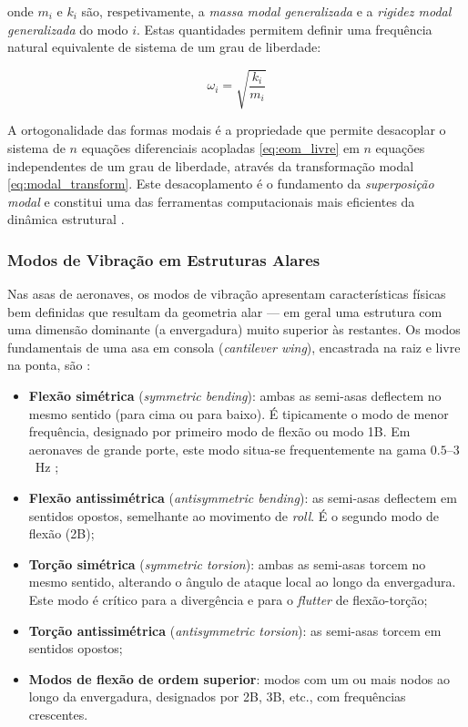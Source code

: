 \documentclass[a4paper,fleqn,noprintline]{cas-dc}
\begin{document}
\noindent onde $m_i$ e $k_i$ são, respetivamente, a \textit{massa modal generalizada} e a \textit{rigidez modal generalizada} do modo $i$. Estas quantidades permitem definir uma frequência natural equivalente de sistema de um grau de liberdade:

\begin{equation}
    \omega_i = \sqrt{\frac{k_i}{m_i}}
    \label{eq:omega_sdof}
\end{equation}

A ortogonalidade das formas modais é a propriedade que permite desacoplar o sistema de $n$ equações diferenciais acopladas \eqref{eq:eom_livre} em $n$ equações independentes de um grau de liberdade, através da transformação modal \eqref{eq:modal_transform}. Este desacoplamento é o fundamento da \textit{superposição modal} e constitui uma das ferramentas computacionais mais eficientes da dinâmica estrutural \cite{Craig2006}.

\subsubsection{Modos de Vibração em Estruturas Alares}

Nas asas de aeronaves, os modos de vibração apresentam características físicas bem definidas que resultam da geometria alar --- em geral uma estrutura com uma dimensão dominante (a envergadura) muito superior às restantes. Os modos fundamentais de uma asa em consola (\textit{cantilever wing}), encastrada na raiz e livre na ponta, são \cite{Bisplinghoff1996, Wright2015}:

\begin{itemize}
    \item \textbf{Flexão simétrica} (\textit{symmetric bending}): ambas as semi-asas deflectem no mesmo sentido (para cima ou para baixo). É tipicamente o modo de menor frequência, designado por primeiro modo de flexão ou modo 1B. Em aeronaves de grande porte, este modo situa-se frequentemente na gama $0.5$--$3$~\si{\hertz} \cite{Megson2012};

    \item \textbf{Flexão antissimétrica} (\textit{antisymmetric bending}): as semi-asas deflectem em sentidos opostos, semelhante ao movimento de \textit{roll}. É o segundo modo de flexão (2B);

    \item \textbf{Torção simétrica} (\textit{symmetric torsion}): ambas as semi-asas torcem no mesmo sentido, alterando o ângulo de ataque local ao longo da envergadura. Este modo é crítico para a divergência e para o \textit{flutter} de flexão-torção;

    \item \textbf{Torção antissimétrica} (\textit{antisymmetric torsion}): as semi-asas torcem em sentidos opostos;

    \item \textbf{Modos de flexão de ordem superior}: modos com um ou mais nodos ao longo da envergadura, designados por 2B, 3B, etc., com frequências crescentes.
\end{itemize}
\end{document}
